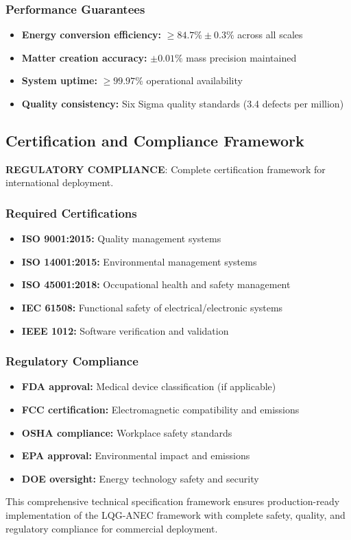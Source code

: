 \documentclass[11pt]{article}
\begin{document}
\subsubsection{Performance Guarantees}
\begin{itemize}
\item \textbf{Energy conversion efficiency:} $\geq 84.7\% \pm 0.3\%$ across all scales
\item \textbf{Matter creation accuracy:} $\pm 0.01\%$ mass precision maintained
\item \textbf{System uptime:} $\geq 99.97\%$ operational availability
\item \textbf{Quality consistency:} Six Sigma quality standards (3.4 defects per million)
\end{itemize}

\subsection{Certification and Compliance Framework}
\textbf{REGULATORY COMPLIANCE}: Complete certification framework for international deployment.

\subsubsection{Required Certifications}
\begin{itemize}
\item \textbf{ISO 9001:2015:} Quality management systems
\item \textbf{ISO 14001:2015:} Environmental management systems
\item \textbf{ISO 45001:2018:} Occupational health and safety management
\item \textbf{IEC 61508:} Functional safety of electrical/electronic systems
\item \textbf{IEEE 1012:} Software verification and validation
\end{itemize}

\subsubsection{Regulatory Compliance}
\begin{itemize}
\item \textbf{FDA approval:} Medical device classification (if applicable)
\item \textbf{FCC certification:} Electromagnetic compatibility and emissions
\item \textbf{OSHA compliance:} Workplace safety standards
\item \textbf{EPA approval:} Environmental impact and emissions
\item \textbf{DOE oversight:} Energy technology safety and security
\end{itemize}

This comprehensive technical specification framework ensures production-ready implementation of the LQG-ANEC framework with complete safety, quality, and regulatory compliance for commercial deployment.

\end{document}
